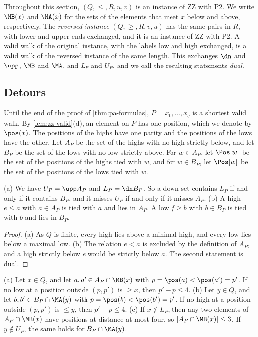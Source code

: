 Throughout this section, $(Q, \leq, R, u, v)$ is an instance of ZZ with P2.
We write $\MB(x)$ and $\MA(x)$ for the sets of the elements that meet $x$ below and above, respectively.
The \emph{reversed instance} $(Q, \geq, R, v, u)$ has the same pairs in $R$, with lower and upper ends exchanged, and it is an instance of ZZ with P2.
A valid walk of the original instance, with the labels low and high exchanged, is a valid walk of the reversed instance of the same length.
This exchanges $\dn$ and $\upp$, $\MB$ and $\MA$, and $L_P$ and $U_P$, and we call the resulting statements \emph{dual}.

\subsection{Detours}
\label{sec:pa-detours}

Until the end of the proof of \cref{thm:pa-formulas}, $P = x_0, \dots, x_q$ is a shortest valid walk.
By \cref{lem:zz-valid}(d), an element on $P$ has one position, which we denote by $\pos(x)$.
The positions of the highs have one parity and the positions of the lows have the other.
Let $A_P$ be the set of the highs with no high strictly below, and let $B_P$ be the set of the lows with no low strictly above.
For $w \in A_P$, let $\Pos[w]$ be the set of the positions of the highs tied with $w$, and for $w \in B_P$, let $\Pos[w]$ be the set of the positions of the lows tied with $w$.

\begin{lemma}
\label{lem:pa-basic}
(a) We have $U_P = \upp A_P$ and $L_P = \dn B_P$.
So a down-set contains $L_P$ if and only if it contains $B_P$, and it misses $U_P$ if and only if it misses $A_P$.
(b) A high $e \leq a$ with $a \in A_P$ is tied with $a$ and lies in $A_P$.
A low $f \geq b$ with $b \in B_P$ is tied with $b$ and lies in $B_P$.
\end{lemma}

\begin{proof}
(a) As $Q$ is finite, every high lies above a minimal high, and every low lies below a maximal low.
(b) The relation $e < a$ is excluded by the definition of $A_P$, and a high strictly below $e$ would be strictly below $a$.
The second statement is dual.
\end{proof}

\begin{lemma}
\label{lem:pa-one}
(a) Let $x \in Q$, and let $a, a' \in A_P \cap \MB(x)$ with $p = \pos(a) < \pos(a') = p'$.
If no low at a position outside $(p, p')$ is $\geq x$, then $p' - p \leq 4$.
(b) Let $y \in Q$, and let $b, b' \in B_P \cap \MA(y)$ with $p = \pos(b) < \pos(b') = p'$.
If no high at a position outside $(p, p')$ is $\leq y$, then $p' - p \leq 4$.
(c) If $x \notin L_P$, then any two elements of $A_P \cap \MB(x)$ have positions at distance at most four, so $|A_P \cap \MB(x)| \leq 3$.
If $y \notin U_P$, the same holds for $B_P \cap \MA(y)$.
\end{lemma}

